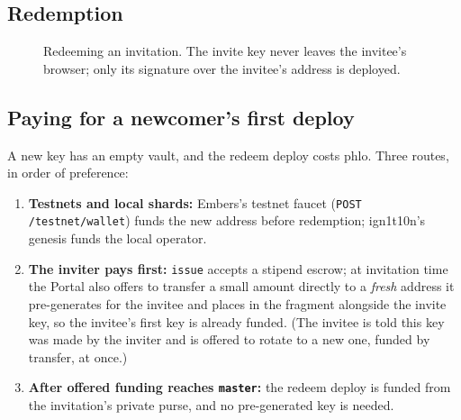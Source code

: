 \documentclass[11pt]{article}
\theoremstyle{definition}
\theoremstyle{remark}
\newcommand{\code}[1]{\texttt{#1}}
\newcommand{\Em}{Embers}
\begin{document}
\subsection{Redemption}

\begin{figure}[ht]
\centering
{}
\caption{Redeeming an invitation. The invite key never leaves the invitee's browser; only its signature over the invitee's address is deployed.}
\label{fig:redeem}
\end{figure}

\subsection{Paying for a newcomer's first deploy}\label{sec:stipend}

A new key has an empty vault, and the redeem deploy costs phlo. Three routes, in order
of preference:

\begin{enumerate}[leftmargin=*,itemsep=2pt]
\item \textbf{Testnets and local shards:} \Em{}'s testnet faucet (\code{POST
  /testnet/wallet}) funds the new address before redemption; ign1t10n's genesis funds
  the local operator.
\item \textbf{The inviter pays first:} \code{issue} accepts a stipend escrow; at
  invitation time the Portal also offers to transfer a small amount directly to a
  \emph{fresh} address it pre-generates for the invitee and places in the fragment
  alongside the invite key, so the invitee's first key is already funded. (The
  invitee is told this key was made by the inviter and is offered to rotate to a new
  one, funded by transfer, at once.)
\item \textbf{After offered funding reaches \code{master}:} the redeem deploy is
  funded from the invitation's private purse, and no pre-generated key is needed.
\end{enumerate}
\end{document}
